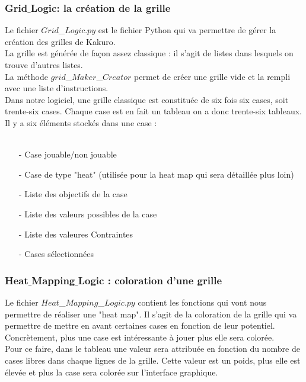 \documentclass[french,12pt]{article}
\begin{document}
\subsubsection{Grid$\_$Logic: la création de la grille}
Le fichier $Grid$\_$Logic.py$ est le fichier Python qui va permettre de gérer la création des grilles de Kakuro. \\ La grille est générée de façon assez classique : il s'agit de listes dans lesquels on trouve d'autres listes. \\
La méthode $grid$\_$Maker$\_$Creator$ permet de créer une grille vide et la rempli avec une liste d'instructions. \\
Dans notre logiciel, une grille classique est constituée de six fois six cases, soit trente-six cases. Chaque case est en fait un tableau on a donc trente-six tableaux. \\
\newpage
Il y a six éléments stockés dans une case : \\ \\
\begin{enumerate}
\item[-] Case jouable/non jouable
\item[-] Case de type "heat" (utilisée pour la heat map qui sera détaillée plus loin)
\item[-] Liste des objectifs de la case
\item[-] Liste des valeurs possibles de la case
\item[-] Liste des valeures Contraintes
\item[-] Cases sélectionnées
\end{enumerate} 

\subsubsection{Heat$\_$Mapping$\_$Logic : coloration d'une grille}

Le fichier $Heat$\_$Mapping$\_$Logic.py$ contient les fonctions qui vont nous permettre de réaliser une "heat map". Il s'agit de la coloration de la grille qui va permettre de mettre en avant certaines cases en fonction de leur potentiel. Concrètement, plus une case est intéressante à jouer plus elle sera colorée. \\
Pour ce faire, dans le tableau une valeur sera attribuée en fonction du nombre de cases libres dans chaque lignes de la grille. Cette valeur est un poids, plus elle est élevée et plus la case sera colorée sur l'interface graphique.  \\ \\
\end{document}
